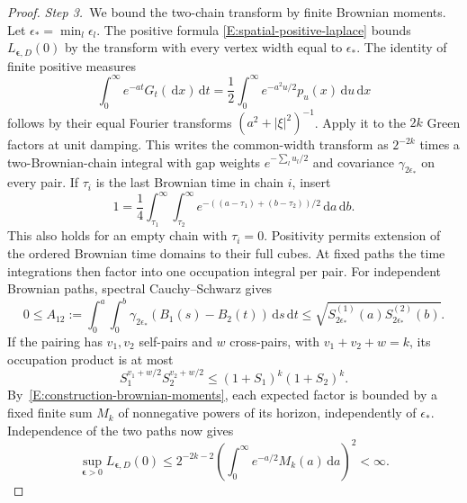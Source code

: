 \documentclass[12pt,oneside,openany]{book}
\numberwithin{equation}{section}
\theoremstyle{nogostyle}
\theoremstyle{definition}
\newcommand{\ud}{\,\mathrm{d}}
\begin{document}
\begin{proof}
  \medskip
  \noindent\textit{Step 3.~}We bound the two-chain transform by finite
  Brownian moments.
  Let $\epsilon_* = \min_l\epsilon_l$. The positive formula
  \eqref{E:spatial-positive-laplace} bounds $L_{\boldsymbol\epsilon,D}(0)$ by
  the transform with every vertex width equal to $\epsilon_*$. The identity of
  finite positive measures
  \[
    \int_0^\infty e^{-at}G_t(\ud x)\ud t
    =\frac12\int_0^\infty e^{-a^2u/2}p_u(x)\ud u\ud x
  \]
  follows by their equal Fourier transforms $(a^2+|\xi|^2)^{-1}$. Apply it to
  the $2k$ Green factors at unit damping. This writes the common-width transform
  as $2^{-2k}$ times a two-Brownian-chain integral with gap weights $e^{-\sum_l
  u_l/2}$ and covariance $\gamma_{2\epsilon_*}$ on every pair. If $\tau_i$ is
  the last Brownian time in chain $i$, insert
  \[
    1=\frac14\int_{\tau_1}^\infty\int_{\tau_2}^\infty
    e^{-((a-\tau_1)+(b-\tau_2))/2}\ud a\ud b.
  \]
  This also holds for an empty chain with $\tau_i = 0$. Positivity permits
  extension of the ordered Brownian time domains to their full cubes. At fixed
  paths the time integrations then factor into one occupation integral per pair.
  For independent Brownian paths, spectral Cauchy--Schwarz gives
  \[
    0\le A_{12}:=\int_0^a\int_0^b
    \gamma_{2\epsilon_*}(B_1(s)-B_2(t))\ud s\ud t
    \le\sqrt{S_{2\epsilon_*}^{(1)}(a)S_{2\epsilon_*}^{(2)}(b)}.
  \]
  If the pairing has $v_1,v_2$ self-pairs and $w$ cross-pairs, with $v_1+v_2+w =
  k$, its occupation product is at most
  \[
    S_1^{v_1+w/2}S_2^{v_2+w/2}\le(1+S_1)^k(1+S_2)^k.
  \]
  By~\eqref{E:construction-brownian-moments}, each expected factor is bounded by
  a fixed finite sum $M_k$ of nonnegative powers of its horizon, independently
  of $\epsilon_*$. Independence of the two paths now gives
  \[
    \sup_{\boldsymbol\epsilon>0}L_{\boldsymbol\epsilon,D}(0)
    \le2^{-2k-2}\left(\int_0^\infty e^{-a/2}M_k(a)\ud a\right)^2<\infty.
  \]



\end{proof}
\end{document}
